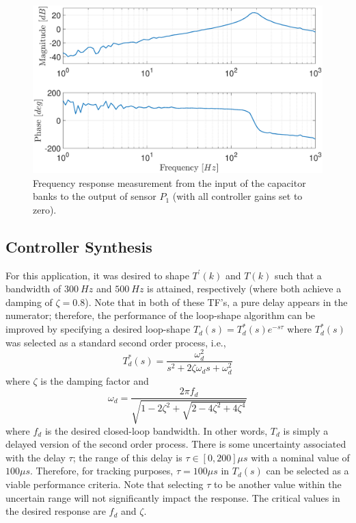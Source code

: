 \documentclass[a4paper, 10pt, conference]{ieeeconf}
\begin{document}
\begin{figure}
\centering
\includegraphics[width=\columnwidth]{../pics/GHP1.eps}
\caption{Frequency response measurement from the input of the capacitor banks to the output of sensor $P_1$ (with all controller gains set to zero).}
\label{fig:GHP1}
\end{figure} 

\subsection{Controller Synthesis}
For this application, it was desired to shape $T^{\prime}(k)$ and $T(k)$ such that a bandwidth of $300 \: Hz$ and $500 \: Hz$ is attained, respectively (where both achieve a damping of $\zeta = 0.8$). Note that in both of these TF's, a pure delay appears in the numerator; therefore, the performance of the loop-shape algorithm can be improved by specifying a desired loop-shape $T_d(s) = T_d^*(s) e^{-s\tau}$ where $T_d^*(s)$ was selected as a standard second order process, i.e.,
\begin{equation}
T_d^*(s) = \frac{\omega_d^2}{s^2 + 2\zeta \omega_d s + \omega_d^2}
\end{equation}
where $\zeta$ is the damping factor and
\begin{equation*}
\omega_d = \frac{2 \pi f_d}{\sqrt{1-2\zeta^2 + \sqrt{2-4\zeta^2 + 4\zeta^4}}}
\end{equation*}
where $f_d$ is the desired closed-loop bandwidth. In other words, $T_d$ is simply a delayed version of the second order process. There is some uncertainty associated with the delay $\tau$; the range of this delay is $\tau \in [0,200]\mu s$ with a nominal value of $100 \mu s$. Therefore, for tracking purposes, $\tau = 100 \mu s$ in $T_d(s)$ can be selected as a viable performance criteria. Note that selecting $\tau$ to be another value within the uncertain range will not significantly impact the response. The critical values in the desired response are $f_d$ and $\zeta$. 
\end{document}

